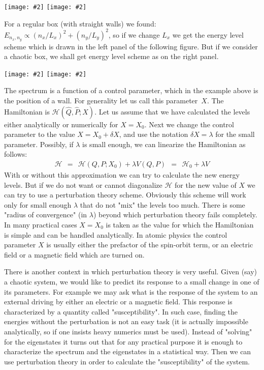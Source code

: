 \documentclass[onecolumn,fleqn, 11pt]{revtex4}
\newcommand{\putgraph}[2][0.30\hsize]{\texttt{[image: \#2]}}
\newcommand{\putgraphr}[2][0.30\hsize]{\texttt{[image: \#2]}}
\newcommand{\beq}{\begin{eqnarray}}
\newcommand{\eeq}{\end{eqnarray}}
\begin{document}
\begin{center}
\putgraph[0.2\hsize]{BoxWithCrookedWall} 
\hspace*{0.2\hsize}
\putgraph[0.2\hsize]{ChaoticBox}
\end{center}

For a regular box (with straight walls) we found: 
${ E_{n_x,n_y} \propto (n_x/L_x)^2 + (n_y/L_y)^2 }$, 
so if we change $L_x$ we get the energy level scheme  
which is drawn in the left panel of the following figure. 
But if we consider a chaotic box, we shall get 
energy level scheme as on the right panel.  

\begin{center}
\putgraphr{RegularBoxMovingWallEnergyLevels} 
\hspace*{0.2\hsize}
\putgraphr{CrookedBoxMovingWallEnergyLevels} 
\end{center}

The spectrum is a function of a control parameter, 
which in the example above is the position of a wall. 
For generality let us call this parameter~$X$. 
The Hamiltonian is $\mathcal{H}(\hat{Q},\hat{P};X)$. 
Let us assume that we have calculated the levels 
either analytically or numerically for $X=X_0$. 
Next we change the control parameter to the 
value ${X=X_0+\delta X}$, and use the 
notation $\delta X=\lambda$ for the small parameter.   
Possibly, if $\lambda$ is small enough, we can linearize 
the Hamiltonian as follows:
\beq
\mathcal{H} \ \ = \ \  
\mathcal{H}(Q,P;X_0) + \lambda V(Q,P)
\ \ = \ \ \mathcal{H}_0 + \lambda V
\eeq 
With or without this approximation we can try  
to calculate the new energy levels. 
But if we do not want or cannot diagonalize $\mathcal{H}$ 
for the new value of $X$ we can try to 
use a perturbation theory scheme. Obviously 
this scheme will work only for small enough $\lambda$ 
that do not "mix" the levels too much.
There is some "radius of convergence" (in $\lambda$) 
beyond which perturbation theory fails completely.
In many practical cases $X=X_0$ is 
taken as the value for which the Hamiltonian is simple 
and can be handled analytically. In atomic physics 
the control parameter $X$ is usually either 
the prefactor of the spin-orbit term, or an 
electric field or a magnetic field which are turned on.   


There is another context in which perturbation theory 
is very useful. Given (say) a chaotic system, 
we would like to predict its response to a small change 
in one of its parameters. For example we may ask  
what is the response of the system to an external 
driving by either an electric or a magnetic field. 
This response is characterized by a quantity called "susceptibility". 
In such case, finding the energies without the perturbation 
is not an easy task (it is actually impossible analytically, 
so if one insists heavy numerics must be used). 
Instead of "solving" for the eigenstates it turns out 
that for any practical purpose it is enough to characterize 
the spectrum and the eigenstates in a statistical 
way. Then we can use perturbation theory in order 
to calculate the "susceptibility" of the system. 
\end{document}

